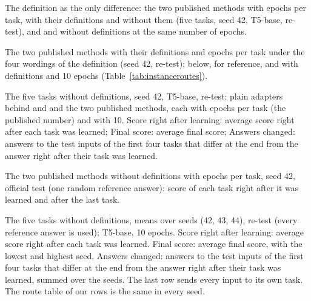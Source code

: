 

\begin{table}[t]
  \caption{The definition as the only difference: the two published methods with \AudFullEpochs{} epochs per task, with their definitions and without them (five tasks, seed 42, T5-base, re-test), and \recog{} and \handicap{} without definitions at the same number of epochs.}
  \label{tab:fulldefinitions}
  \centering
  
\end{table}

\begin{table}[t]
  \caption{The two published methods with their definitions and \AudFullEpochs{} epochs per task under the four wordings of the definition (seed 42, re-test); below, for reference, \cert{} and \recog{} with definitions and 10 epochs (Table~\ref{tab:instanceroutes}).}
  \label{tab:fullwordings}
  \centering
  
\end{table}

\begin{table}[t]
  \caption{The five tasks without definitions, seed 42, T5-base, re-test: plain adapters behind \recog{} and \handicap{} and the two published methods, each with \AudFullEpochs{} epochs per task (the published number) and with 10. Score right after learning: average score right after each task was learned; Final score: average final score; Answers changed: answers to the test inputs of the first four tasks that differ at the end from the answer right after their task was learned.}
  \label{tab:noinstfull}
  \centering
  
\end{table}

\begin{table}[t]
  \caption{The two published methods without definitions with \AudFullEpochs{} epochs per task, seed 42, official test (one random reference answer): score of each task right after it was learned and after the last task.}
  \label{tab:noinstfullpertask}
  \centering
  
\end{table}

\begin{table}[t]
  \caption{The five tasks without definitions, means over \AudSeedsN{} seeds (42, 43, 44), re-test (every reference answer is used); T5-base, 10 epochs. Score right after learning: average score right after each task was learned. Final score: average final score, with the lowest and highest seed. Answers changed: answers to the test inputs of the first four tasks that differ at the end from the answer right after their task was learned, summed over the seeds. The last row sends every input to its own task. The route table of our rows is the same in every seed.}
  \label{tab:noinstseeds}
  \centering
  
\end{table}

